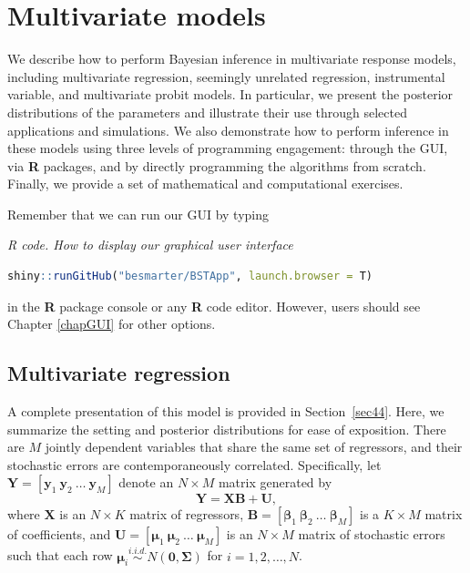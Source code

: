 \chapter{Multivariate models}\label{chap7}

We describe how to perform Bayesian inference in multivariate response models, including multivariate regression, seemingly unrelated regression, instrumental variable, and multivariate probit models. In particular, we present the posterior distributions of the parameters and illustrate their use through selected applications and simulations. We also demonstrate how to perform inference in these models using three levels of programming engagement: through the GUI, via \textbf{R} packages, and by directly programming the algorithms from scratch. Finally, we provide a set of mathematical and computational exercises.

Remember that we can run our GUI by typing

\begin{tcolorbox}[enhanced,width=4.67in,center upper,
	fontupper=\large\bfseries,drop shadow southwest,sharp corners]
	\textit{R code. How to display our graphical user interface}
	\begin{VF}
		\begin{lstlisting}[language=R]
	shiny::runGitHub("besmarter/BSTApp", launch.browser = T)
\end{lstlisting}
	\end{VF}
\end{tcolorbox} 

in the \textbf{R} package console or any \textbf{R} code editor. However, users should see Chapter \ref{chapGUI} for other options.

\section{Multivariate regression}\label{sec71}

A complete presentation of this model is provided in Section~\ref{sec44}. Here, we summarize the setting and posterior distributions for ease of exposition. There are $M$ jointly dependent variables that share the same set of regressors, and their stochastic errors are contemporaneously correlated. Specifically, let $\bm{Y} = \left[ \bm{y}_1 \ \bm{y}_2 \ \ldots \ \bm{y}_M \right]$ denote an $N \times M$ matrix generated by
\[
\bm{Y} = \bm{X}\bm{B} + \bm{U},
\]
where $\bm{X}$ is an $N \times K$ matrix of regressors, $\bm{B} = \left[ \bm{\beta}_1 \ \bm{\beta}_2 \ \ldots \ \bm{\beta}_M \right]$ is a $K \times M$ matrix of coefficients, and $\bm{U} = \left[ \bm{\mu}_1 \ \bm{\mu}_2 \ \ldots \ \bm{\mu}_M \right]$ is an $N \times M$ matrix of stochastic errors such that each row $\bm{\mu}_i \stackrel{i.i.d.}{\sim} N(\bm{0}, \bm{\Sigma})$ for $i = 1, 2, \dots, N$.

